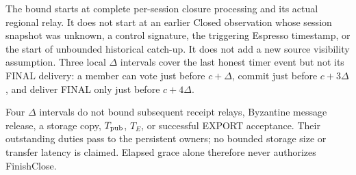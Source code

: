 The bound starts at complete per-session closure processing and its
actual regional relay. It does not start at an earlier Closed observation
whose session snapshot was unknown, a control signature, the triggering Espresso timestamp, or the
start of unbounded historical catch-up. It does not add a new source
visibility assumption. Three local $\Delta$ intervals cover the last
honest timer event but not its FINAL delivery: a member can vote just
before $c+\Delta$, commit just before $c+3\Delta$, and deliver FINAL
only just before $c+4\Delta$.

Four $\Delta$ intervals do not bound subsequent receipt relays,
Byzantine message release, a storage copy, $T_{\rm pub}$, $T_E$, or
successful EXPORT acceptance. Their outstanding duties pass to the
persistent owners; no bounded storage size or transfer latency is
claimed. Elapsed grace alone therefore never authorizes FinishClose.

